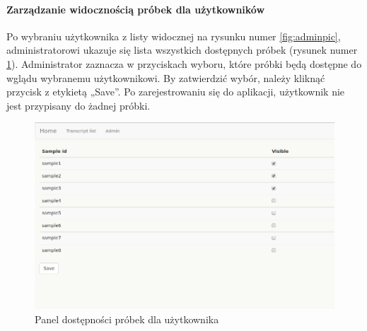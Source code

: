 \documentclass[a4paper,12pt,twoside]{article}
\begin{document}
\newpage
\paragraph{Zarządzanie widocznością próbek dla użytkowników}
Po wybraniu użytkownika z listy widocznej na rysunku numer \ref{fig:adminpic},
administratorowi ukazuje się lista wszystkich dostępnych próbek (rysunek numer \ref{fig:user_priviligespic}). Administrator zaznacza w przyciskach wyboru, które próbki będą dostępne
do wglądu wybranemu użytkownikowi. By zatwierdzić wybór, należy kliknąć
przycisk z etykietą „Save”.
Po zarejestrowaniu się do aplikacji, użytkownik nie jest przypisany do żadnej próbki.

\begin{figure}[h]
\centering
\includegraphics[width=\textwidth]{obrazy/aplikacja/user_priviliges.png}
\caption{Panel dostępności próbek dla użytkownika}
\label{fig:user_priviligespic}
\end{figure}

\newpage
{}
\end{document}
